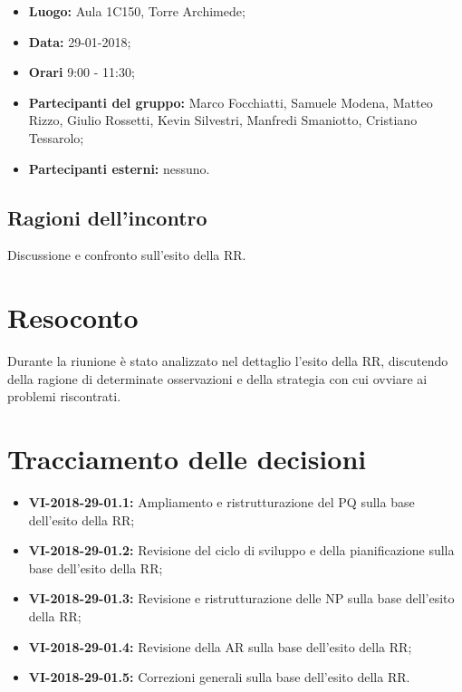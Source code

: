 \documentclass[openany,12pt,a4paper]{article}
\begin{document}
	\begin{itemize} 
	    \item \textbf{Luogo:} Aula 1C150, Torre Archimede;
	    \item \textbf{Data:} 29-01-2018;
	    \item \textbf{Orari} 9:00 - 11:30;
	    \item \textbf{Partecipanti del gruppo:} Marco Focchiatti, Samuele Modena, Matteo Rizzo, Giulio Rossetti, Kevin Silvestri, Manfredi Smaniotto, Cristiano Tessarolo;
	    \item \textbf{Partecipanti esterni:} nessuno.
	\end{itemize}
	
	\subsection{Ragioni dell'incontro}
	
	Discussione e confronto sull'esito della RR.

	\section{Resoconto}
	
	Durante la riunione è stato analizzato nel dettaglio l'esito della RR, discutendo della ragione di determinate osservazioni e della strategia con cui ovviare ai problemi riscontrati.  
	
	\section{Tracciamento delle decisioni}
	
	\begin{itemize}
	    \item \textbf{VI-2018-29-01.1:} Ampliamento e ristrutturazione del PQ sulla base dell'esito della RR;
	    \item \textbf{VI-2018-29-01.2:} Revisione del ciclo di sviluppo e della pianificazione sulla base dell'esito della RR;
	    \item \textbf{VI-2018-29-01.3:} Revisione e ristrutturazione delle NP sulla base dell'esito della RR;
	    \item \textbf{VI-2018-29-01.4:} Revisione della AR sulla base dell'esito della RR;
	    \item \textbf{VI-2018-29-01.5:} Correzioni generali sulla base dell'esito della RR.
	\end{itemize}	

	
\end{document}
